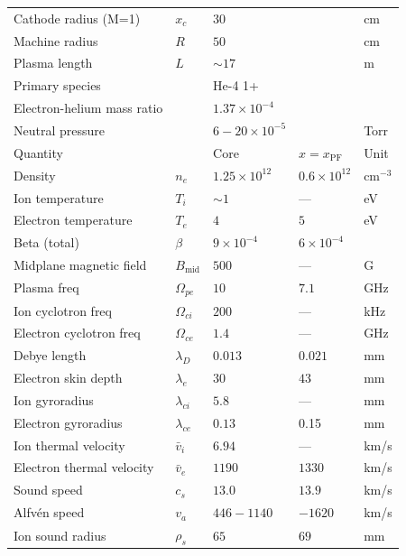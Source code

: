 \begin{table}
    \centering
    \setlength\extrarowheight{-6pt}
    \begin{tabular}{l l l l l}
        Cathode radius (M=1) & $x_c$ & $30$ && cm \\
        Machine radius & $R$ & $50$ && cm \\
        Plasma length & $L$ & $\sim 17$ && m \\
        Primary species && He-4 1+ \\ 
        Electron-helium mass ratio && $1.37 \times 10^{-4}$ \\
        Neutral pressure && $6 - 20 \times 10^{-5}$ && Torr \\
        \hline
        Quantity &  & Core & $x=x_\text{PF}$ & Unit \\
        \hline
        Density & $n_e$ &  $1.25 \times 10^{12}$ & $ 0.6 \times 10^{12}$ & $\text{cm}^{-3}$ \\
        Ion temperature & $T_i$ & $\sim 1$ & — & eV \\
        Electron temperature & $T_e$ & $4$ & $5$ & eV \\
        Beta (total) & $\beta$ & $9 \times 10^{-4}$ & $6 \times 10^{-4}$ & \\
        Midplane magnetic field & $B_\text{mid}$ & $500$ & — & G \\
        Plasma freq & $\Omega_{pe}$ & $10$ & $7.1 $& GHz \\
        Ion cyclotron freq & $\Omega_{ci}$ & $200$ & — & kHz \\
        Electron cyclotron freq & $\Omega_{ce}$ & $1.4$ & — & GHz \\
        Debye length & $\lambda_D$ & $0.013$ & $0.021$ & mm \\
        Electron skin depth & $\lambda_{e}$ & $30$ & $43$ & mm\\
        Ion gyroradius & $\lambda_{ci}$ & $5.8$ & — & mm \\
        Electron gyroradius & $\lambda_{ce}$ & $0.13$ & 0.15 & mm \\
        Ion thermal velocity & $\bar{v}_i$ & $6.94$ & — & km/s\\
        Electron thermal velocity & $\bar{v}_{e}$ & $1190$ & $1330$ & km/s \\
        Sound speed & $c_s$ & $13.0$ & $13.9$ & km/s\\
        Alfvén speed & $v_a$ & $446 - 1140$ & $ - 1620$ & km/s \\
        Ion sound radius & $\rho_s$ & $65$ & $69$ & mm\\

\end{tabular}
\end{table}
